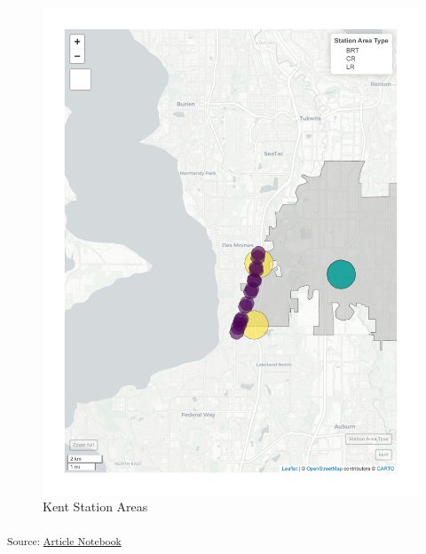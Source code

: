 \documentclass[
]{agujournal2019}
\begin{document}
\begin{figure}[H]

{\centering \includegraphics{index_files/figure-pdf/results-case-studies-kent-stations-1.pdf}

}

\caption{Kent Station Areas}

\end{figure}%

\textsubscript{Source:
\href{https://tiernanmartin.github.io/2024-transit-oriented-development-bill/index.qmd.html}{Article
Notebook}}
\end{document}
